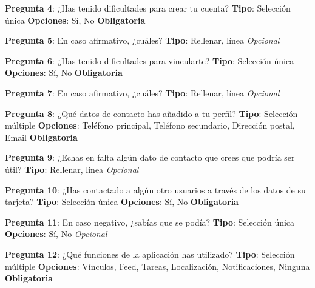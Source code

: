 \textbf{Pregunta 4}: ¿Has tenido dificultades para crear tu cuenta?\newline
\textbf{Tipo}: Selección única \newline
\textbf{Opciones}: Sí, No\newline
\textbf{Obligatoria}

\textbf{Pregunta 5}: En caso afirmativo, ¿cuáles?\newline
\textbf{Tipo}: Rellenar, línea\newline
\emph{Opcional}

\textbf{Pregunta 6}: ¿Has tenido dificultades para vincularte?\newline
\textbf{Tipo}: Selección única \newline
\textbf{Opciones}: Sí, No\newline
\textbf{Obligatoria}

\textbf{Pregunta 7}: En caso afirmativo, ¿cuáles?\newline
\textbf{Tipo}: Rellenar, línea\newline
\emph{Opcional}

\textbf{Pregunta 8}: ¿Qué datos de contacto has añadido a tu perfil?\newline
\textbf{Tipo}: Selección múltiple \newline
\textbf{Opciones}: Teléfono principal, Teléfono secundario, Dirección postal, Email
\textbf{Obligatoria}

\textbf{Pregunta 9}: ¿Echas en falta algún dato de contacto que crees que podría ser útil?\newline
\textbf{Tipo}: Rellenar, línea\newline
\emph{Opcional}

\textbf{Pregunta 10}: ¿Has contactado a algún otro usuarios a través de los datos de su tarjeta?\newline
\textbf{Tipo}: Selección única \newline
\textbf{Opciones}: Sí, No\newline
\textbf{Obligatoria}

\newpage

\textbf{Pregunta 11}: En caso negativo, ¿sabías que se podía?\newline
\textbf{Tipo}: Selección única \newline
\textbf{Opciones}: Sí, No\newline
\emph{Opcional}

\textbf{Pregunta 12}: ¿Qué funciones de la aplicación has utilizado?\newline
\textbf{Tipo}: Selección múltiple \newline
\textbf{Opciones}: Vínculos, Feed, Tareas, Localización, Notificaciones, Ninguna
\textbf{Obligatoria}

